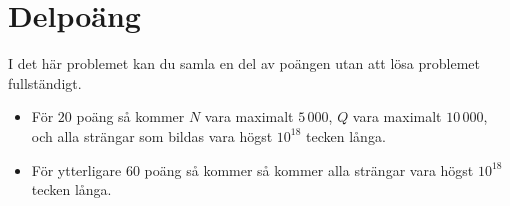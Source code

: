 \section*{Delpoäng}

I det här problemet kan du samla en del av poängen utan att
lösa problemet fullständigt.

\begin{itemize}
    \item För $20$ poäng så kommer $N$ vara maximalt $5\,000$, $Q$ vara maximalt $10\,000$, och alla strängar som bildas vara högst $10^{18}$ tecken långa.
    \item För ytterligare $60$ poäng så kommer så kommer alla strängar vara högst $10^{18}$ tecken långa.
\end{itemize}
